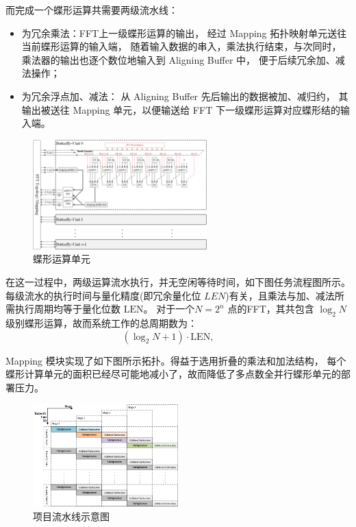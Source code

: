 而完成一个蝶形运算共需要两级流水线：
\begin{itemize}
    \item {}为冗余乘法：FFT上一级蝶形运算的输出，
            经过 Mapping 拓扑映射单元送往当前蝶形运算的输入端，
            随着输入数据的串入，乘法执行结束，与次同时，
            乘法器的输出也逐个数位地输入到 Aligning Buffer 中，
            便于后续冗余加、减法操作；
    \item {}为冗余浮点加、减法：
            从 Aligning Buffer 先后输出的数据被加、减归约，
            其输出被送往 Mapping 单元，以便输送给 FFT 下一级蝶形运算对应蝶形结的输入端。
\end{itemize}


\begin{center}
    \begin{figure}[ht!]
        \centering
        \includegraphics[width=0.6\textwidth]{figures/Float_Redundant_Butterfly_Unit.png}
        \caption{蝶形运算单元}
        \label{fig:Float-Redundant-Butterfly-Unit}
    \end{figure}
\end{center}

在这一过程中，两级运算流水执行，并无空闲等待时间，如下图任务流程图所示。
每级流水的执行时间与量化精度(即冗余量化位 $LEN$)有关，且乘法与加、减法所需执行周期均等于量化位数 $\mathrm{LEN}$。
对于一个$N=2^n$ 点的FFT，其共包含 $\log_2N$ 级别蝶形运算，故而系统工作的总周期数为：
\begin{equation*}
    (\log_2 N+1)\cdot \mathrm{LEN},\qquad \tag{C1}
\end{equation*}

Mapping 模块实现了如下图所示拓扑。得益于选用折叠的乘法和加法结构，
每个蝶形计算单元的面积已经尽可能地减小了，故而降低了多点数全并行蝶形单元的部署压力。
\begin{center}
    \begin{figure}[h!]
        \centering
        \includegraphics[width=0.5\textwidth]{figures/Pipeline.png}
        \caption{项目流水线示意图}
        \label{fig:Pipeline}
    \end{figure}
\end{center}

